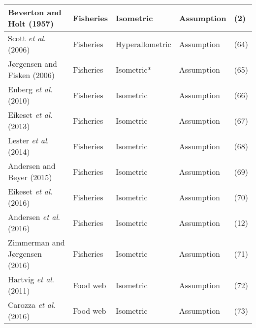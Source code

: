 \documentclass[a4paper]{article} %
\begin{document}
\begin{table}[H]
\begin{tabular}{|l|l|l|l|l|}
    Beverton and Holt (1957)                & Fisheries                 & Isometric        & Assumption                        & (2)           \\ \hline
    Scott \textit{et al}. (2006)            & Fisheries                 & Hyperallometric  & Assumption                        & (64)          \\ \hline
    Jørgensen and Fisken (2006)             & Fisheries                 & Isometric*       & Assumption                        & (65)          \\ \hline
    Enberg \textit{et al}. (2010)           & Fisheries                 & Isometric        & Assumption                        & (66)          \\ \hline
    Eikeset \textit{et al}. (2013)          & Fisheries                 & Isometric        & Assumption                        & (67)          \\ \hline
    Lester \textit{et al}. (2014)           & Fisheries                 & Isometric        & Assumption                        & (68)          \\ \hline
    Andersen and Beyer (2015)               & Fisheries                 & Isometric        & Assumption                        & (69)          \\ \hline
    Eikeset \textit{et al}. (2016)          & Fisheries                 & Isometric        & Assumption                        & (70)          \\ \hline
    Andersen \textit{et al}. (2016)         & Fisheries                 & Isometric        & Assumption                        & (12)          \\ \hline
    Zimmerman and Jørgensen (2016)          & Fisheries                 & Isometric        & Assumption                        & (71)          \\ \hline
    Hartvig \textit{et al}. (2011)          & Food web                  & Isometric        & Assumption                        & (72)          \\ \hline
    Carozza \textit{et al}. (2016)          & Food web                  & Isometric        & Assumption                        & (73)          \\ \hline
    \end{tabular}
\end{table}

\newpage{}

\let\mkbibnamefamily\textsc\printbibliography[title=Bibliography]\thispagestyle{empty} %
\end{document}
